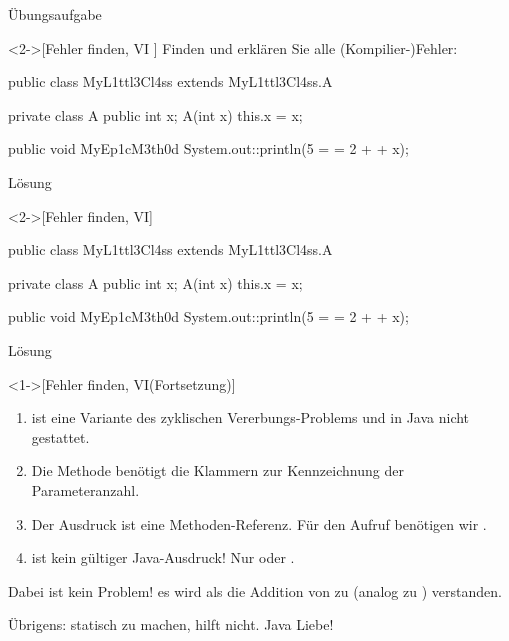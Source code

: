 \begin{frame}[c,fragile]{Übungsaufgabe}
    \begin{exercise}<2->[Fehler finden, VI ]
        \pause{}Finden und erklären Sie alle (Kompilier-)Fehler:\pause{}
{\footnotesize
        \begin{plainvoid}
public class MyL1ttl3Cl4ss extends MyL1ttl3Cl4ss.A {
    private class A {
        public int x;
        A(int x) { this.x = x; }
    }

    public void MyEp1cM3th0d {
        System.out::println(5 = = 2 + + x);
    }
}
        \end{plainvoid}
}
    \end{exercise}
\end{frame}

\begin{frame}[c,fragile]{Lösung}
    \begin{solve}<2->[Fehler finden, VI]
        \pause{}\footnotesize\begin{plainjava}
public class MyL1ttl3Cl4ss extends MyL1ttl3Cl4ss.A {
    private class A {
        public int x;
        A(int x) { this.x = x; }
    }

    public void MyEp1cM3th0d {
        System.out::println(5 = = 2 + + x);
    }
}
        \end{plainjava}
    \end{solve}
\end{frame}

\begin{frame}[c]{Lösung}
    \addtocounter{solve}{-1}
    \begin{solve}<1->[Fehler finden, VI\hfill{}(Fortsetzung)]
        \begin{enumerate}
            \item {} ist eine Variante des zyklischen Vererbungs-Problems und in Java nicht gestattet.
            \item Die Methode  benötigt die Klammern zur Kennzeichnung der Parameteranzahl.
            \item Der Ausdruck  ist eine Methoden-Referenz. Für den Aufruf benötigen wir .
            \item \bjava[showspaces]{= =} ist kein gültiger Java-Ausdruck! Nur \bjava{==} oder \bjava{=}.
        \end{enumerate}
        \pause{}Dabei ist  kein Problem! es wird als die Addition von  zu  (analog zu ) verstanden.\smallskip\pause\par
        Übrigens:  statisch zu machen, hilft nicht. Java Liebe!%
    \end{solve}
\end{frame}

\fi

